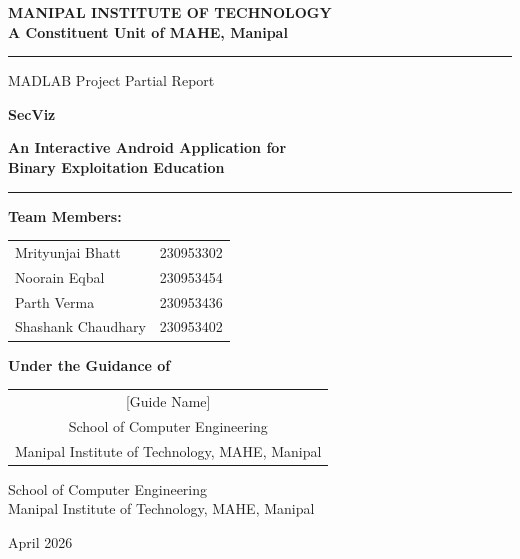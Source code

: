 \documentclass[12pt,a4paper]{article}
\begin{document}
\begin{titlepage}
    \centering
    \vspace*{1.5cm}
    {\large\bfseries MANIPAL INSTITUTE OF TECHNOLOGY\\
    \normalsize A Constituent Unit of MAHE, Manipal\par}
    \vspace{0.6cm}
    \rule{\linewidth}{1.5pt}\par
    \vspace{0.4cm}
    {\small MADLAB Project Partial Report\par}
    \vspace{0.3cm}
    {\Huge\bfseries\color{svblue} SecViz\par}
    \vspace{0.2cm}
    {\LARGE\bfseries An Interactive Android Application for\\[4pt]
    Binary Exploitation Education\par}
    \vspace{0.4cm}
    \rule{\linewidth}{1.5pt}\par
    \vspace{1.2cm}

    {\normalsize\bfseries Team Members:\par}
    \vspace{0.4cm}
    \begin{tabular}{ll}
        Mrityunjai Bhatt    & 230953302 \\[4pt]
        Noorain Eqbal       & 230953454 \\[4pt]
        Parth Verma         & 230953436 \\[4pt]
        Shashank Chaudhary  & 230953402
    \end{tabular}

    \vspace{1.2cm}
    {\normalsize\bfseries Under the Guidance of\par}
    \vspace{0.3cm}
    \begin{tabular}{cc}
        \multicolumn{2}{c}{[Guide Name]} \\
        \multicolumn{2}{c}{School of Computer Engineering} \\
        \multicolumn{2}{c}{Manipal Institute of Technology, MAHE, Manipal}
    \end{tabular}

    \vfill
    {\normalsize School of Computer Engineering\\
    Manipal Institute of Technology, MAHE, Manipal\par}
    \vspace{0.4cm}
    {\normalsize April 2026\par}
\end{titlepage}
\end{document}

